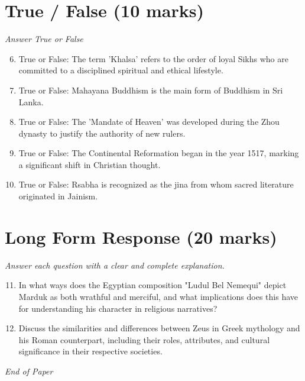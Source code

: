 \documentclass[12pt]{article}
\begin{document}
\section*{True / False (10 marks)}
\textit{Answer True or False}
\begin{enumerate}[label=\arabic*.]
\setcounter{enumi}{5}
\item True or False: The term 'Khalsa' refers to the order of loyal Sikhs who are committed to a disciplined spiritual and ethical lifestyle.
\item True or False: Mahayana Buddhism is the main form of Buddhism in Sri Lanka.
\item True or False: The 'Mandate of Heaven' was developed during the Zhou dynasty to justify the authority of new rulers.
\item True or False: The Continental Reformation began in the year 1517, marking a significant shift in Christian thought.
\item True or False: Rsabha is recognized as the jina from whom sacred literature originated in Jainism.
\end{enumerate}

\section*{Long Form Response (20 marks)}
\textit{Answer each question with a clear and complete explanation.}
\begin{enumerate}[label=\arabic*.]
\setcounter{enumi}{10}
\item In what ways does the Egyptian composition "Ludul Bel Nemequi" depict Marduk as both wrathful and merciful, and what implications does this have for understanding his character in religious narratives?
\item Discuss the similarities and differences between Zeus in Greek mythology and his Roman counterpart, including their roles, attributes, and cultural significance in their respective societies.
\end{enumerate}

\vfill
\noindent\textit{End of Paper}
\end{document}
